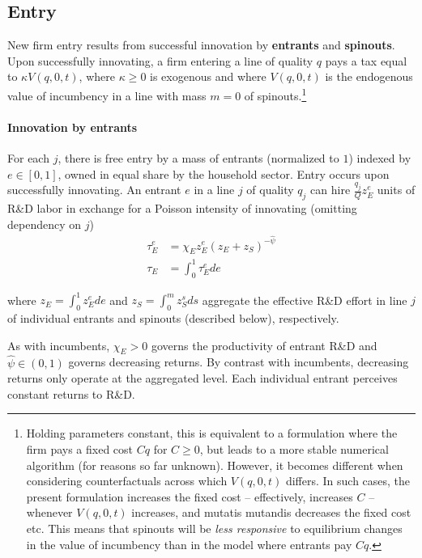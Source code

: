 \documentclass[12pt,english]{article}
\theoremstyle{remark}
\begin{document}
\subsection{Entry} 

New firm entry results from successful innovation by \textbf{entrants} and \textbf{spinouts}. Upon successfully innovating, a firm entering a line of quality $q$ pays a tax equal to $\kappa V(q,0,t)$, where $\kappa \ge 0$ is exogenous and where $V(q,0,t)$ is the endogenous value of incumbency in a line with mass $m = 0$ of spinouts.\footnote{Holding parameters constant, this is equivalent to a formulation where the firm pays a fixed cost $Cq$ for $C \ge 0$, but leads to a more stable numerical algorithm (for reasons so far unknown). However, it becomes different when considering counterfactuals across which $V(q,0,t)$ differs. In such cases, the present formulation increases the fixed cost -- effectively, increases $C$ -- whenever $V(q,0,t)$ increases, and mutatis mutandis decreases the fixed cost etc. This means that spinouts will be \textit{less responsive} to equilibrium changes in the value of incumbency than in the model where entrants pay $Cq$.}

\paragraph{Innovation by entrants} For each $j$, there is free entry by a mass of entrants (normalized to $1$) indexed by $e \in [0,1]$, owned in equal share by the household sector. Entry occurs upon successfully innovating. An entrant $e$ in a line $j$ of quality $q_j$ can hire $\frac{q_j}{Q} z_E^e$ units of R\&D labor in exchange for a Poisson intensity of innovating (omitting dependency on $j$)
\begin{align}
\tau_E^e &= \chi_E z_E^e (z_E + z_S)^{-\hat{\psi}} \label{simplified_entrant_innovation_rate} \\
\tau_E &= \int_0^1 \tau_E^e de \nonumber
\end{align}

where $z_E = \int_0^1 z_E^e de$ and $z_S = \int_0^{m} z_S^s ds$ aggregate the effective R\&D effort in line $j$ of individual entrants and spinouts (described below), respectively. 

As with incumbents, $\chi_E > 0$ governs the productivity of entrant R\&D and $\hat{\psi} \in (0,1)$ governs decreasing returns. By contrast with incumbents, decreasing returns only operate at the aggregated level. Each individual entrant perceives constant returns to R\&D. 
\end{document}
